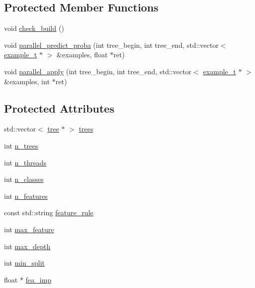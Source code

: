 \subsection*{Protected Member Functions}
\begin{DoxyCompactItemize}
\item 
void \hyperlink{classforest_a6d3de328bb42e043aa5d927782b46c9f}{check\+\_\+build} ()
\item 
void \hyperlink{classforest_a26e2ddcd79b84bbf8ba5cb7f5b290555}{parallel\+\_\+predict\+\_\+proba} (int tree\+\_\+begin, int tree\+\_\+end, std\+::vector$<$ \hyperlink{classexample__t}{example\+\_\+t} $\ast$ $>$ \&examples, float $\ast$ret)
\item 
void \hyperlink{classforest_a42a632c9230cdc805ce5688bffd1e224}{parallel\+\_\+apply} (int tree\+\_\+begin, int tree\+\_\+end, std\+::vector$<$ \hyperlink{classexample__t}{example\+\_\+t} $\ast$ $>$ \&examples, int $\ast$ret)
\end{DoxyCompactItemize}
\subsection*{Protected Attributes}
\begin{DoxyCompactItemize}
\item 
std\+::vector$<$ \hyperlink{classtree}{tree} $\ast$ $>$ \hyperlink{classforest_a4645ed80361bfa95d2135a816f67344a}{trees}
\item 
int \hyperlink{classforest_ad1cb197d16e4895d196a4981f55d73ef}{n\+\_\+trees}
\item 
int \hyperlink{classforest_aad86b5a13d5e997c9ecdbc1f7f7403a5}{n\+\_\+threads}
\item 
int \hyperlink{classforest_a9a590d3e77b865dbe24fd2139a774efc}{n\+\_\+classes}
\item 
int \hyperlink{classforest_aad957ae462b977de8cd4ff3068bd1c7b}{n\+\_\+features}
\item 
const std\+::string \hyperlink{classforest_ab0e48cb7addef717515b7e50d8448215}{feature\+\_\+rule}
\item 
int \hyperlink{classforest_a9a36ad3c46bc93d915017bce1fe907e9}{max\+\_\+feature}
\item 
int \hyperlink{classforest_a97477164b075fe86ee3e7b410d848df3}{max\+\_\+depth}
\item 
int \hyperlink{classforest_adb7bee85249f613b64e82e2f855c2a39}{min\+\_\+split}
\item 
float $\ast$ \hyperlink{classforest_a0db5d386945b32abfd695573cc91db89}{fea\+\_\+imp}
\end{DoxyCompactItemize}


